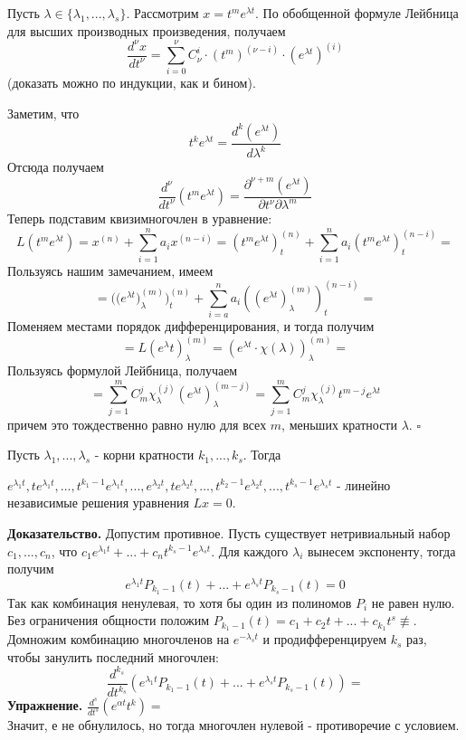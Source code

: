 Пусть $\lambda\in \{\lambda_1,...,\lambda_s\}$. Рассмотрим 
$x=t^me^{\lambda t}$. По обобщенной формуле Лейбница для высших производных
произведения, получаем
$$\frac{d^\nu x}{dt^\nu} = \sum\limits_{i=0}^{\nu} C^i_\nu \cdot 
(t^m)^{(\nu - i)}\cdot (e^{\lambda t})^{(i)}$$ 
(доказать можно по индукции, как и бином). 

Заметим, что 
$$t^ke^{\lambda t} = \frac{d^{k}(e^{\lambda t})}{d\lambda^{k}}$$
Отсюда получаем 
$$\frac{d^\nu }{dt^\nu}(t^me^{\lambda t}) = 
\frac{\partial^{\nu+m} (e^{\lambda t})}{\partial t^\nu \partial\lambda^m} $$
Теперь подставим квизимногочлен в уравнение:
$$L(t^me^{\lambda t}) = x^{(n)}+\sum\limits_{i=1}^{n} a_ix^{(n-i)} = 
(t^me^{\lambda t})^{(n)}_t+\sum\limits_{i=1}^{n} 
a_i(t^me^{\lambda t})^{(n-i)}_t=$$
Пользуясь нашим замечанием, имеем
$$=\big(\Big(e^{\lambda t}\Big)^{(m)}_\lambda\big)^{(n)}_t + 
\sum\limits_{i=a}^{n} a_i((e^{\lambda t})^{(m)}_\lambda)^{(n-i)}_t=$$
Поменяем местами порядок дифференцирования, и тогда получим
$$=L(e^\lambda t)^{(m)}_\lambda = (e^{\lambda t}\cdot 
\chi(\lambda))^{(m)}_\lambda = $$ 
Пользуясь формулой Лейбница, получаем
$$=\sum\limits_{j=1}^{m} C^j_m\chi^{(j)}_\lambda(e^{\lambda t})^{(m-j)}_\lambda
= \sum\limits_{j=1}^{m} C^j_m\chi^{(j)}_\lambda t^{m-j}e^{\lambda t}$$
причем это тождественно равно нулю для всех $m$, меньших кратности  $\lambda$. 
$\square$

\begin{theor}
Пусть $\lambda_1,...,\lambda_s$ - корни кратности $k_1,...,k_s$. Тогда


$e^{\lambda_1 t},te^{\lambda_1 t},...,t^{k_1-1}e^{\lambda_1 t},...,
e^{\lambda_2 t},te^{\lambda_2 t},...,t^{k_2-1}e^{\lambda_2 t},...,
t^{k_{s}-1}e^{\lambda_st}$ - линейно независимые решения уравнения $Lx=0$. 
\end{theor}
\textbf{Доказательство.}  Допустим противное. Пусть существует нетривиальный
набор $c_1,...,c_n$, что $c_1e^{\lambda_1t}+...+c_nt^{k_s-1}e^{\lambda_st}$. 
Для каждого $\lambda_i$ вынесем экспоненту, тогда получим
$$e^{\lambda_1t}P_{k_1-1}(t)+...+e^{\lambda_st}P_{k_s-1}(t)=0$$
Так как комбинация ненулевая, то хотя бы один из полиномов 
$P_i$ не равен нулю. Без ограничения общности положим 
$P_{k_1-1}(t) = c_1+c_2t+...+c_{k_1}t^s\not\equiv$. 
Домножим комбинацию многочленов на $e^{-\lambda_st}$ и продифференцируем 
$k_s$ раз, чтобы занулить последний многочлен:
$$\frac{d^{k_s}}{dt^{k_s}}(e^{\lambda_1t}P_{k_1-1}(t)+
...+e^{\lambda_st}P_{k_s-1}(t)) = $$ 
\textbf{Упражнение.} $\frac{d^s}{dt^s}(e^{\alpha t}t^k) = $  \\
Значит, е не обнулилось, но тогда многочлен нулевой - противоречие с условием.


